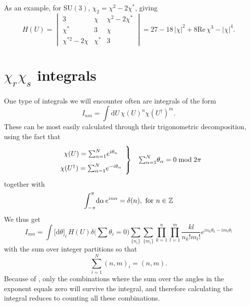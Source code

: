 As an example, for SU$(3)$, $\chi_2 = \chi^2 - 2 \chi^*$, giving
%
\begin{equation} \label{eq:su3-haar-measure}
  H(U) =
  \begin{vmatrix}
    3 & \chi & \chi^2 - 2 \chi^* \\
    \chi^* & 3 & \chi \\
    \chi^{*2} - 2 \chi & \chi^* & 3
  \end{vmatrix} = 27 - 18\, |\chi|^2  + 8 \mathrm{Re}\, \chi^3 - |\chi|^4.
\end{equation}

\section{\texorpdfstring{$\chi_r \chi_s$}{Ln Lm} integrals} \label{sec:character_integrals}

One type of integrals we will encounter often are integrals of the form
%
\begin{equation}
  I_{nm} = \int \mathrm{d} U \, \chi(U)^n \chi(U^{\dagger})^m.
\end{equation}
%
These can be most easily calculated through their trigonometric decomposition,
using the fact that
%
\begin{equation}
  \left. \renewcommand{\arraystretch}{1.75}
  \begin{array}{c}
    \chi(U) = {\textstyle\sum_{\alpha=1}^N} e^{i \theta_\alpha} \\
    \chi(U^{\dagger}) = {\textstyle\sum_{\alpha=1}^N} e^{- i \theta_\alpha}
  \end{array}\right\}\kern-\nulldelimiterspace
  \hskip1em {\textstyle\sum_{\alpha=1}^N} \theta_{\alpha} = 0 \bmod 2\pi
\end{equation}
%
together with
%
\begin{equation} \label{eq:oscillating-integral}
  \int_{\mathrlap{-\pi}}^{\pi} \mathrm{d}\alpha \, e^{in \alpha} = \delta(n),
  \text{ for } n \in \mathbb{Z}
\end{equation}
%
We thus get
%
\begin{equation}
  I_{nm} = \int \big[ \mathrm{d} \theta \big]_i\, H(U)
  \delta\big({\textstyle\sum}\theta_i = 0\big)
  \sum_{\{n_i\}} \sum_{\{m_i\}} \prod_{k=1}^n
  \prod_{l=1}^m \frac{k l}{n_k! m_l!} e^{i n_k \theta_k - i m_l \theta_l}
\end{equation}
%
with the sum over integer partitions so that
%
\begin{equation}
  \sum_{i=1}^N (n,m)_i = (n,m).
\end{equation}
%
Because of , only the combinations where the sum
over the angles in the exponent equals zero will survive the integral, and
therefore calculating the integral reduces to counting all these combinations.

